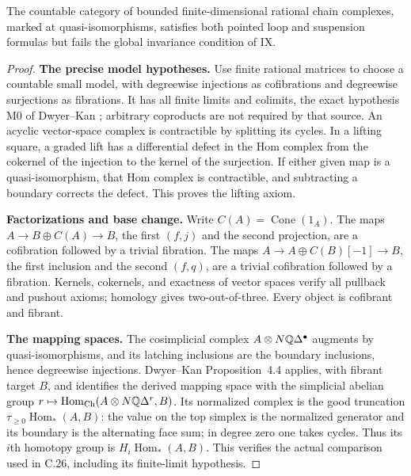 \begin{proposition}
\label{F:C26-complexes}
The countable category of bounded finite-dimensional rational chain
complexes, marked at quasi-isomorphisms, satisfies both pointed loop and
suspension formulas but fails the global invariance condition of IX.
\end{proposition}
\begin{proof}
\textbf{The precise model hypotheses.} Use finite rational matrices to
choose a countable small model, with degreewise injections as
cofibrations and degreewise surjections as fibrations. It has all finite
limits and colimits, the exact hypothesis M0 of Dwyer--Kan
\cite[Section~1.4(iv)]{dwyerkan1980function}; arbitrary coproducts are
not required by that source. An acyclic vector-space complex is
contractible by splitting its cycles. In a lifting square, a graded lift
has a differential defect in the Hom complex from the cokernel of the
injection to the kernel of the surjection. If either given map is a
quasi-isomorphism, that Hom complex is contractible, and subtracting a
boundary corrects the defect. This proves the lifting axiom.

\textbf{Factorizations and base change.} Write $C(A)=\operatorname{Cone}(1_A)$.
The maps $A\to B\oplus C(A)\to B$, the first $(f,j)$ and the second
projection, are a cofibration followed by a trivial fibration. The maps
$A\to A\oplus C(B)[-1]\to B$, the first inclusion and the second $(f,q)$,
are a trivial cofibration followed by a fibration. Kernels, cokernels,
and exactness of vector spaces verify all pullback and pushout axioms;
homology gives two-out-of-three. Every object is cofibrant and fibrant.

\textbf{The mapping spaces.} The cosimplicial complex
$A\otimes N\mathbb Q\Delta^\bullet$ augments by quasi-isomorphisms, and its
latching inclusions are the boundary inclusions, hence degreewise
injections. Dwyer--Kan Proposition~4.4 applies, with fibrant target $B$,
and identifies the derived mapping space with the simplicial abelian
group $r\mapsto\operatorname{Hom}_{\mathrm{Ch}}(A\otimes N\mathbb Q\Delta^r,B)$.
Its normalized complex is the good truncation
$\tau_{\geq0}\operatorname{Hom}_*(A,B)$: the value on the top simplex is
the normalized generator and its boundary is the alternating face sum;
in degree zero one takes cycles. Thus its $i$th homotopy group is
$H_i\operatorname{Hom}_*(A,B)$. This verifies the actual comparison used
in C.26, including its finite-limit hypothesis.


\end{proof}
